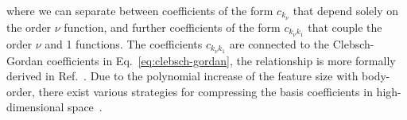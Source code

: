 where we can separate between coefficients of the form $c_{k_\nu}$ that depend solely on the order $\nu$ function, and further coefficients of the form $c_{k_\nu k_1}$ that couple the order $\nu$ and 1 functions.
The coefficients $c_{k_\nu k_1}$ are connected to the Clebsch-Gordan coefficients in Eq.~\eqref{eq:clebsch-gordan}, the relationship is more formally derived in Ref.~\cite{niga+20jcp}. 
Due to the polynomial increase of the feature size with body-order, there exist various strategies for compressing the basis coefficients in high-dimensional space~\cite{kondor_clebsch_2018,yan2019fourier,niga+20jcp}.

%
%

